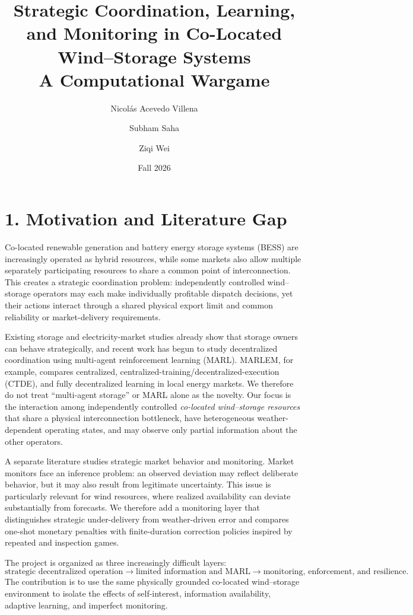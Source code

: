 \documentclass[10pt]{article}
\title{\vspace{-1.3em}
\textbf{Strategic Coordination, Learning, and Monitoring in Co-Located Wind--Storage Systems}\\
\large A Computational Wargame
\vspace{-0.5em}}
\author{Nicol\'as Acevedo Villena \and Subham Saha \and Ziqi Wei}
\date{Fall 2026}
\begin{document}
\maketitle
\vspace{-1.2em}

\section*{1. Motivation and Literature Gap}

Co-located renewable generation and battery energy storage systems (BESS) are increasingly operated as hybrid resources, while some markets also allow multiple separately participating resources to share a common point of interconnection. This creates a strategic coordination problem: independently controlled wind--storage operators may each make individually profitable dispatch decisions, yet their actions interact through a shared physical export limit and common reliability or market-delivery requirements.

Existing storage and electricity-market studies already show that storage owners can behave strategically, and recent work has begun to study decentralized coordination using multi-agent reinforcement learning (MARL). MARLEM, for example, compares centralized, centralized-training/decentralized-execution (CTDE), and fully decentralized learning in local energy markets. We therefore do not treat ``multi-agent storage'' or MARL alone as the novelty. Our focus is the interaction among independently controlled \emph{co-located wind--storage resources} that share a physical interconnection bottleneck, have heterogeneous weather-dependent operating states, and may observe only partial information about the other operators.

A separate literature studies strategic market behavior and monitoring. Market monitors face an inference problem: an observed deviation may reflect deliberate behavior, but it may also result from legitimate uncertainty. This issue is particularly relevant for wind resources, where realized availability can deviate substantially from forecasts. We therefore add a monitoring layer that distinguishes strategic under-delivery from weather-driven error and compares one-shot monetary penalties with finite-duration correction policies inspired by repeated and inspection games.

The project is organized as three increasingly difficult layers:
\[
\boxed{
\text{strategic decentralized operation}
\rightarrow
\text{limited information and MARL}
\rightarrow
\text{monitoring, enforcement, and resilience}.
}
\]
The contribution is to use the same physically grounded co-located wind--storage environment to isolate the effects of self-interest, information availability, adaptive learning, and imperfect monitoring.
\end{document}
